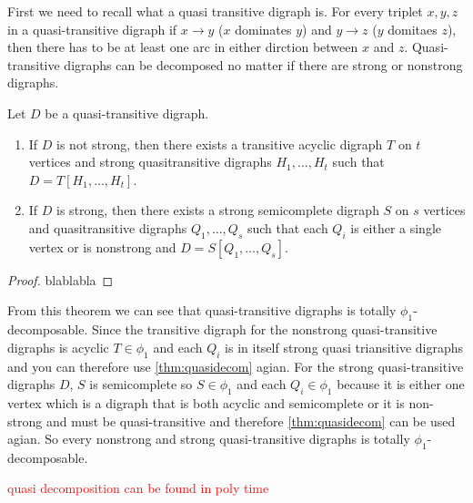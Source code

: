 First we need to recall what a quasi transitive digraph is. 
For every triplet $x,y,z$ in a quasi-transitive digraph if $x\rightarrow y$ ($x$ dominates $y$) and $y\rightarrow z$ ($y$ domitaes $z$), then there has to be at least one arc in either dirction between $x$ and $z$. Quasi-transitive digraphs can be decomposed no matter if there are strong or nonstrong digraphs. 
\begin{thm}\cite{bangJGT85}
    Let $D$ be a quasi-transitive digraph.
    \begin{enumerate}
        \item If $D$ is not strong, then there exists a transitive acyclic digraph $T$ on $t$ vertices and strong quasitransitive digraphs $H_1,\dots,H_t$ such that $D=T[H_1,\dots,H_t]$.
        \item If $D$ is strong, then there exists a strong semicomplete digraph $S$ on $s$ vertices and quasitransitive digraphs $Q_1,\dots ,Q_s$ such that each $Q_i$ is either a single vertex or is nonstrong and $D=S[Q_1,\dots,Q_s]$.
    \end{enumerate}
    \label{thm:quasidecom}
\end{thm}
\begin{proof}
    blablabla
\end{proof}
From this theorem we can see that quasi-transitive digraphs is totally $\phi_1$-decomposable. 
Since the transitive digraph for the nonstrong quasi-transitive digraphs is acyclic $T\in \phi_1$ and each $Q_i$ is in itself strong quasi triansitive digraphs and you can therefore use \autoref{thm:quasidecom} agian.  
For the strong quasi-transitive digraphs $D$, $S$ is semicomplete so $S\in \phi_1$ and each $Q_i \in \phi_1$ because it is either one vertex which is a digraph that is both acyclic and semicomplete or it is non-strong and must be quasi-transitive and therefore \autoref{thm:quasidecom} can be used agian. So every nonstrong and strong quasi-transitive digraphs is totally $\phi_1$-decomposable.

\begin{thm}
    \textcolor{red}{quasi decomposition can be found in poly time}
\end{thm}
